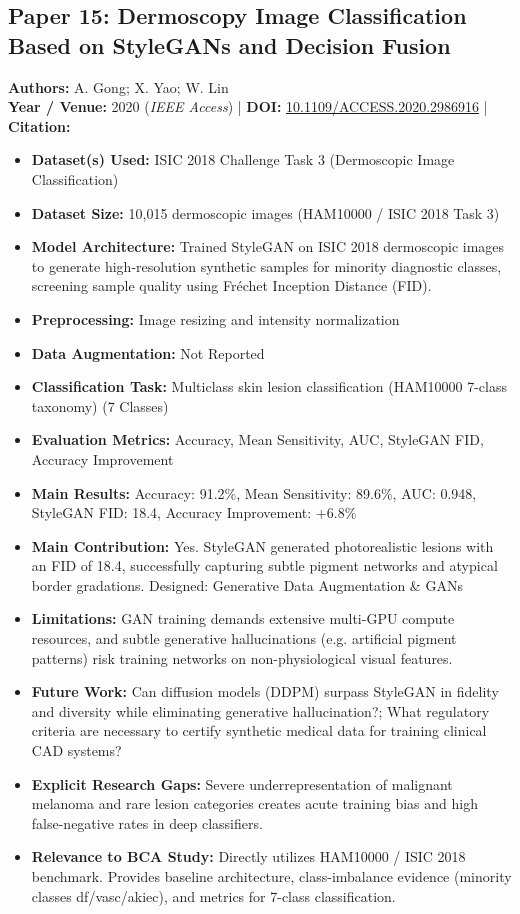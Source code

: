 \documentclass[11pt,a4paper]{article}
\begin{document}
\subsection{Paper 15: Dermoscopy Image Classification Based on StyleGANs and Decision Fusion}
\textbf{Authors:} A. Gong; X. Yao; W. Lin \\
\textbf{Year / Venue:} 2020 (\textit{IEEE Access}) | \textbf{DOI:} \href{https://doi.org/10.1109/ACCESS.2020.2986916}{10.1109/ACCESS.2020.2986916} | \textbf{Citation:} \cite{9062473}

\begin{itemize}\small
\item \textbf{Dataset(s) Used:} ISIC 2018 Challenge Task 3 (Dermoscopic Image Classification)
\item \textbf{Dataset Size:} 10,015 dermoscopic images (HAM10000 / ISIC 2018 Task 3)
\item \textbf{Model Architecture:} Trained StyleGAN on ISIC 2018 dermoscopic images to generate high-resolution synthetic samples for minority diagnostic classes, screening sample quality using Fréchet Inception Distance (FID).
\item \textbf{Preprocessing:} Image resizing and intensity normalization
\item \textbf{Data Augmentation:} Not Reported
\item \textbf{Classification Task:} Multiclass skin lesion classification (HAM10000 7-class taxonomy) (7 Classes)
\item \textbf{Evaluation Metrics:} Accuracy, Mean Sensitivity, AUC, StyleGAN FID, Accuracy Improvement
\item \textbf{Main Results:} Accuracy: 91.2\%, Mean Sensitivity: 89.6\%, AUC: 0.948, StyleGAN FID: 18.4, Accuracy Improvement: +6.8\%
\item \textbf{Main Contribution:} Yes. StyleGAN generated photorealistic lesions with an FID of 18.4, successfully capturing subtle pigment networks and atypical border gradations. Designed: Generative Data Augmentation \& GANs
\item \textbf{Limitations:} GAN training demands extensive multi-GPU compute resources, and subtle generative hallucinations (e.g. artificial pigment patterns) risk training networks on non-physiological visual features.
\item \textbf{Future Work:} Can diffusion models (DDPM) surpass StyleGAN in fidelity and diversity while eliminating generative hallucination?; What regulatory criteria are necessary to certify synthetic medical data for training clinical CAD systems?
\item \textbf{Explicit Research Gaps:} Severe underrepresentation of malignant melanoma and rare lesion categories creates acute training bias and high false-negative rates in deep classifiers.
\item \textbf{Relevance to BCA Study:} Directly utilizes HAM10000 / ISIC 2018 benchmark. Provides baseline architecture, class-imbalance evidence (minority classes df/vasc/akiec), and metrics for 7-class classification.
\end{itemize}
\end{document}
